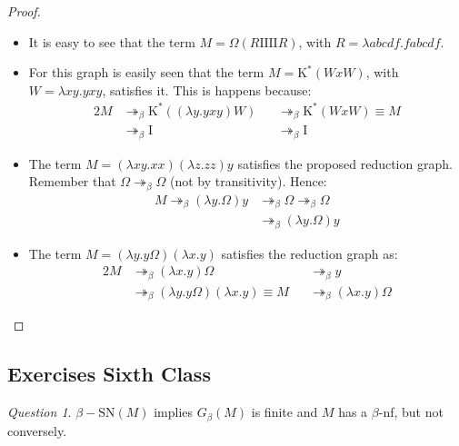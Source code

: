 \documentclass[11pt]{article}
\theoremstyle{definition}
\theoremstyle{remark}
\theoremstyle{remark}
\newtheorem{question}{Question}
\theoremstyle{definition}
\newcommand{\I}{\pmb{\mathrm{I}}}
\newcommand{\K}{\pmb{\mathrm{K}}}
\begin{document}
\begin{proof}
\begin{itemize}
    \item It is easy to see that the term $M = \Omega (R \I\I\I\I R)$, with
          $R = \lambda abcdf. fabcdf$.

    \item For this graph is easily seen that the term $M = \K^*(WxW)$, with
          $W = \lambda xy. yxy$, satisfies it. This is happens because:
          \begin{alignat*}{2}
            M &\twoheadrightarrow_\beta \K^*((\lambda y. yxy)W)
            &&\twoheadrightarrow_\beta \K^* (WxW) \equiv M \\
            &\twoheadrightarrow_\beta \I &&\twoheadrightarrow_\beta \I
          \end{alignat*}

    \item The term $M = (\lambda xy. xx) (\lambda z. zz) y$ satisfies the
          proposed reduction graph. Remember that
          $\Omega \twoheadrightarrow_\beta \Omega$ (not by transitivity). Hence:
          \begin{align*}
            M \twoheadrightarrow_\beta (\lambda y. \Omega) y
            & \twoheadrightarrow_\beta \Omega
              \twoheadrightarrow_\beta \Omega\\
            &\twoheadrightarrow_\beta (\lambda y. \Omega) y
          \end{align*}

    \item The term $M = (\lambda y. y\Omega)(\lambda x. y)$ satisfies the
          reduction graph as:
          \begin{alignat*}{2}
            M &\twoheadrightarrow_\beta (\lambda x. y)\Omega
            &&\twoheadrightarrow_\beta y \\
            &\twoheadrightarrow_\beta (\lambda y. y\Omega)(\lambda x.y) \equiv M
            &&\twoheadrightarrow_\beta (\lambda x. y)\Omega
          \end{alignat*}
  \end{itemize}
\end{proof}

\subsection{Exercises Sixth Class}
\begin{question}
  $\beta-\mathrm{SN}(M)$ implies $G_\beta(M)$ is finite and $M$ has a
  $\beta$-nf, but not conversely.
\end{question}
\end{document}
